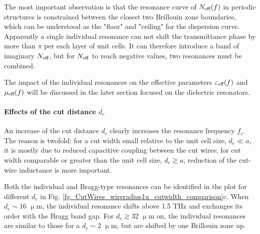 The most important observation is that the resonance curve of $N_{\text{eff} }(f)$ in periodic structures is constrained between the closest two Brillouin zone boundaries, which can be understood as the "floor" and "ceiling" for the dispersion curve. Apparently a single individual resonance can not shift the transmittance phase by more than $\pi$ per each layer of unit cells. It can therefore introduce a band of imaginary $N_{\text{eff} }$, but for $N_{\text{eff} }$ to reach negative values, two resonances must be combined.

The impact of the individual resonances on the effective parameters $\varepsilon_{\text{eff} }(f)$ and $\mu_{\text{eff} }(f)$ will be discussed in the later section focused on the dielectric resonators. %

\paragraph{Effects of the cut distance $d_c$}%
An increase of the cut distance $d_c$ clearly increases the resonance frequency $f_c$. The reason is twofold: for a cut width small relative to the unit cell size, $d_c\ll a$, it is mostly due to reduced capacitive coupling between the cut wires; for cut width comparable or greater than the unit cell size, $d_c \gtrsim a$, reduction of the cut-wire inductance is more important.

Both the individual and Bragg-type resonances can be identified in the plot for different $d_c$ in Fig. \ref{fg_CutWires_wireradius1u_cutwidth_comparison}c. When $d_c \sim 16$  $\upmu$m, the individual resonance shifts above 1.5 THz and exchanges its order with the Bragg band gap. 
For $d_c \gtrsim 32$  $\upmu$m on, the individual resonances are similar to those for a $d_c\sim 2$ $\upmu$m, but are shifted by one Brillouin zone up.

